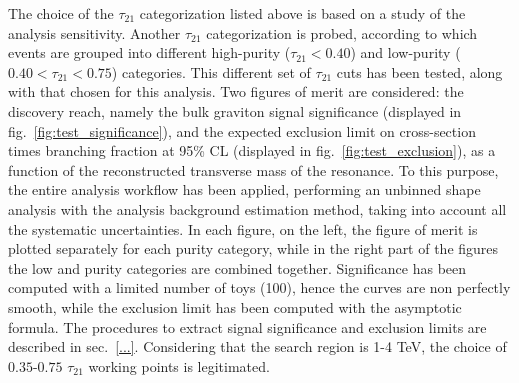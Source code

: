
\noindent The choice of the $\tau_{21}$ categorization listed above is based on a study of the analysis sensitivity. Another $\tau_{21}$ categorization is probed, according to which events are grouped into different high-purity ($\tau_{21} < 0.40$) and low-purity ($0.40 < \tau_{21} < 0.75$) categories. This different set of $\tau_{21}$ cuts has been tested, along with that chosen for this analysis. Two figures of merit are considered: the discovery reach, namely the bulk graviton signal significance (displayed in fig.~\ref{fig:test_significance}), and the expected exclusion limit on cross-section times branching fraction at 95\% CL (displayed in fig.~\ref{fig:test_exclusion}), as a function of the reconstructed transverse mass of the resonance. To this purpose, the entire analysis workflow has been applied, performing an unbinned shape analysis with the analysis background estimation method, taking into account all the systematic uncertainties. In each figure, on the left, the figure of merit is plotted separately for each purity category, while in the right part of the figures the low and purity categories are combined together. Significance has been computed with a limited number of toys (100), hence the curves are non perfectly smooth, while the exclusion limit has been computed with the asymptotic formula. The procedures to extract signal significance and exclusion limits are described in sec.~\ref{...}. Considering that the search region is 1-4 TeV, the choice of $0.35$-$0.75$ $\tau_{21}$ working points is legitimated.

